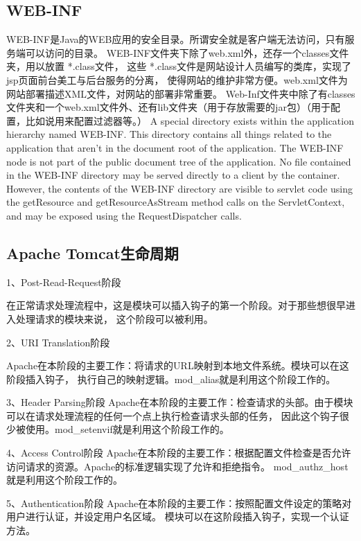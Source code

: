 \documentclass{book}
\begin{document}
\subsection{WEB-INF}

WEB-INF是Java的WEB应用的安全目录。所谓安全就是客户端无法访问，只有服务端可以访问的目录。
WEB-INF文件夹下除了web.xml外，还存一个classes文件夹，用以放置 *.class文件，
这些 *.class文件是网站设计人员编写的类库，实现了jsp页面前台美工与后台服务的分离，
使得网站的维护非常方便。web.xml文件为网站部署描述XML文件，对网站的部署非常重要。
Web-Inf文件夹中除了有classes文件夹和一个web.xml文件外、还有lib文件夹（用于存放需要的jar包）（用于配置，比如说用来配置过滤器等。）
A special directory exists within the application hierarchy named  WEB-INF. 
This directory contains all things related to the application that aren’t 
in the document root of the application. The  WEB-INF node is not part of 
the public document tree of the application. 
No file contained in the WEB-INF directory may be served directly to a client by the container. 
However, the contents of the WEB-INF directory are visible to servlet code using the getResource 
and getResourceAsStream method calls on the ServletContext, and may be exposed using 
the RequestDispatcher calls.

\subsection{Apache Tomcat生命周期}

1、Post-Read-Request阶段

在正常请求处理流程中，这是模块可以插入钩子的第一个阶段。对于那些想很早进入处理请求的模块来说，
这个阶段可以被利用。

2、URI Translation阶段 

Apache在本阶段的主要工作：将请求的URL映射到本地文件系统。模块可以在这阶段插入钩子，
执行自己的映射逻辑。mod\_alias就是利用这个阶段工作的。

3、Header Parsing阶段
Apache在本阶段的主要工作：检查请求的头部。由于模块可以在请求处理流程的任何一个点上执行检查请求头部的任务，
因此这个钩子很少被使用。mod\_setenvif就是利用这个阶段工作的。

4、Access Control阶段 
Apache在本阶段的主要工作：根据配置文件检查是否允许访问请求的资源。Apache的标准逻辑实现了允许和拒绝指令。
mod\_authz\_host就是利用这个阶段工作的。

5、Authentication阶段
Apache在本阶段的主要工作：按照配置文件设定的策略对用户进行认证，并设定用户名区域。
模块可以在这阶段插入钩子，实现一个认证方法。
\end{document}
